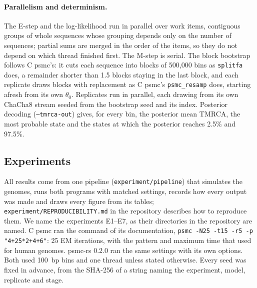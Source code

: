 \documentclass[11pt]{article}
\newcommand{\psmcrs}{psmc-rs}
\newcommand{\opt}[1]{\texttt{#1}}
\begin{document}
\paragraph{Parallelism and determinism.} The E-step and the log-likelihood run in parallel over work items, contiguous groups of whole sequences whose grouping depends only on the number of sequences; partial sums are merged in the order of the items, so they do not depend on which thread finished first. The M-step is serial. The block bootstrap \citep{kunsch1989} follows C psmc's: it cuts each sequence into blocks of 500,000 bins as \texttt{splitfa} does, a remainder shorter than 1.5 blocks staying in the last block, and each replicate draws blocks with replacement as C psmc's \texttt{psmc\_resamp} does, starting afresh from its own $\theta_0$. Replicates run in parallel, each drawing from its own ChaCha8 stream seeded from the bootstrap seed and its index. Posterior decoding (\opt{--tmrca-out}) gives, for every bin, the posterior mean TMRCA, the most probable state and the states at which the posterior reaches 2.5\% and 97.5\%.

\subsection*{Experiments}

All results come from one pipeline (\texttt{experiment/pipeline}) that simulates the genomes, runs both programs with matched settings, records how every output was made and draws every figure from its tables; \texttt{experiment/REPRODUCIBILITY.md} in the repository describes how to reproduce them. We name the experiments E1--E7, as their directories in the repository are named. C psmc ran the command of its documentation, \texttt{psmc -N25 -t15 -r5 -p "4+25*2+4+6"}: 25 EM iterations, with the pattern and maximum time that \citet{li2011} used for human genomes. \psmcrs{} 0.2.0 ran the same settings with its own options. Both used 100~bp bins and one thread unless stated otherwise. Every seed was fixed in advance, from the SHA-256 of a string naming the experiment, model, replicate and stage.
\end{document}
